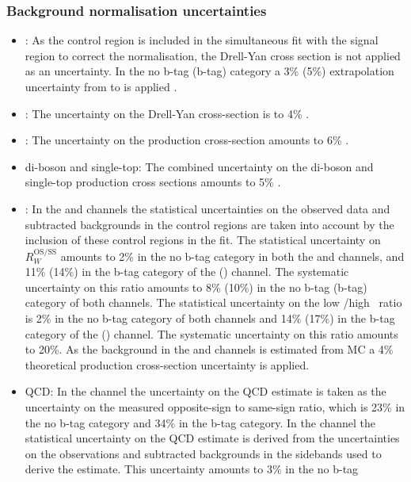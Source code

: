 \subsubsection*{Background normalisation uncertainties}
\begin{itemize}
\setlength{\itemsep}{-\baselineskip}
\item \Ztautau: As the \Zmm control region is included in the simultaneous
fit with the signal region to correct the \Ztautau normalisation,
the Drell-Yan cross section is not applied as an uncertainty. In the no b-tag (b-tag) category a 3\% (5\%)
extrapolation uncertainty from \Zmm to \Ztautau is applied \cite{CMS-PAS-HIG-16-037}.
\item \Zellell: The uncertainty on the Drell-Yan cross-section
is to 4\% \cite{CMS-PAS-HIG-16-037}.
\item \ttbar: The uncertainty on the \ttbar production cross-section amounts
to 6\% \cite{CMS-PAS-HIG-16-037}.
\item di-boson and single-top: The combined uncertainty on the di-boson and
single-top production cross sections amounts to 5\% \cite{CMS-PAS-HIG-16-037}.
\item \Wjets: In the \mutau and \etau channels the statistical uncertainties
on the observed data and subtracted backgrounds in the control regions are taken into account by
the inclusion of these control regions in the fit. The statistical
uncertainty on $R_{W}^{\text{OS/SS}}$ amounts to 2\% in the no b-tag
category in both the \etau and \mutau channels, and 11\% (14\%) in the b-tag
category of the \mutau (\etau) channel. The systematic uncertainty on
this ratio amounts to 8\% (10\%) in the no b-tag (b-tag) category of both channels.
The statistical uncertainty on the low \mT/high \mT~ratio is 2\% in the no b-tag
category of both channels and 14\% (17\%) in the b-tag category of the \mutau (\etau) channel.
The systematic uncertainty on this ratio amounts to 20\%. As the \Wjets background
in the \tautau and \emu channels is estimated from \ac{MC} a 4\% theoretical
production cross-section uncertainty is applied.
\item QCD: In the \emu channel the uncertainty on the QCD estimate
is taken as the uncertainty on the measured opposite-sign to same-sign
ratio, which is 23\% in the no b-tag category and 34\% in the b-tag category. In the
\tautau channel the statistical uncertainty on the QCD estimate is derived from
the uncertainties on the observations and subtracted backgrounds in the
sidebands used to derive the estimate. This uncertainty amounts to 3\% in the no b-tag

\end{itemize}
